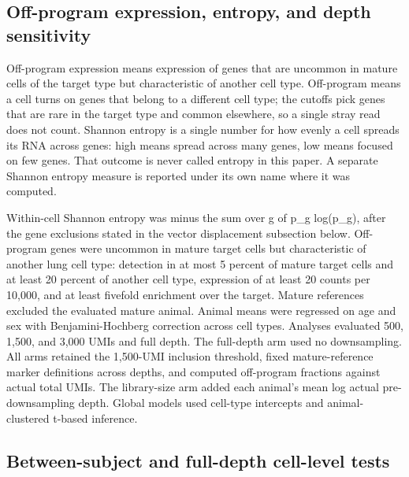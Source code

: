 \documentclass[11pt]{article}
\begin{document}
\subsection*{Off-program expression, entropy, and depth sensitivity}

Off-program expression means expression of genes that are uncommon in mature cells of the target type but characteristic of another cell type. Off-program means a cell turns on genes that belong to a different cell type; the cutoffs pick genes that are rare in the target type and common elsewhere, so a single stray read does not count. Shannon entropy is a single number for how evenly a cell spreads its RNA across genes: high means spread across many genes, low means focused on few genes. That outcome is never called entropy in this paper. A separate Shannon entropy measure is reported under its own name where it was computed.

Within-cell Shannon entropy was minus the sum over g of p\_g log(p\_g), after the gene exclusions stated in the vector displacement subsection below. Off-program genes were uncommon in mature target cells but characteristic of another lung cell type: detection in at most 5 percent of mature target cells and at least 20 percent of another cell type, expression of at least 20 counts per 10,000, and at least fivefold enrichment over the target. Mature references excluded the evaluated mature animal. Animal means were regressed on age and sex with Benjamini-Hochberg correction across cell types. Analyses evaluated 500, 1,500, and 3,000 UMIs and full depth. The full-depth arm used no downsampling. All arms retained the 1,500-UMI inclusion threshold, fixed mature-reference marker definitions across depths, and computed off-program fractions against actual total UMIs. The library-size arm added each animal's mean log actual pre-downsampling depth. Global models used cell-type intercepts and animal-clustered t-based inference.

\subsection*{Between-subject and full-depth cell-level tests}
\end{document}
